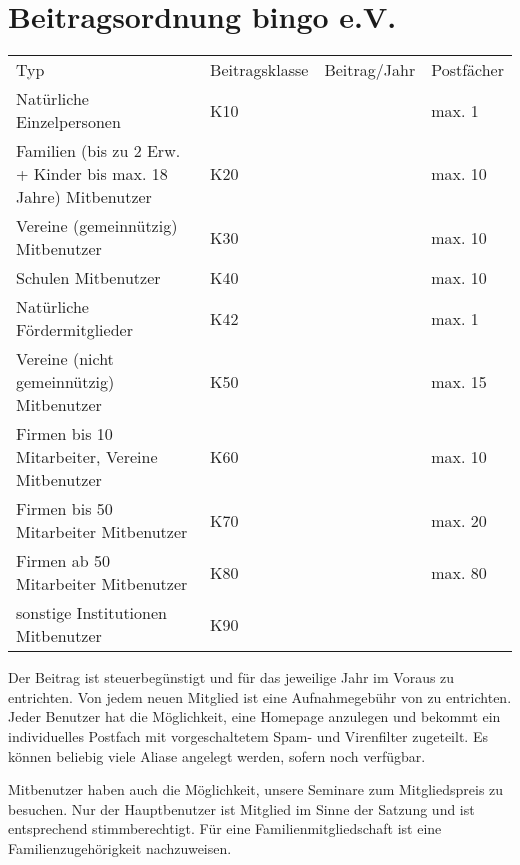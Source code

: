 \section{Beitragsordnung bingo e.V.} \label{sec:beitragsordnung}
\begin{tabu}{X[3]XX[r]X}
	\rowfont{\bfseries}
	Typ                                                             & Beitrags\-klasse& Beitrag/Jahr      & Postfächer \\
	Natürliche Einzelpersonen                                       & K10             &         & max. 1 \\
	Familien (bis zu 2 Erw. + Kinder bis max. 18 Jahre) Mitbenutzer & K20             &         & max. 10\\
	Vereine (gemeinnützig) Mitbenutzer                              & K30             &         & max. 10\\
	Schulen Mitbenutzer                                             & K40             &         & max. 10\\
	Natürliche Fördermitglieder																			& K42             &        & max. 1 \\
	Vereine (nicht gemeinnützig) Mitbenutzer                        & K50             &        & max. 15\\
	Firmen bis 10 Mitarbeiter, Vereine Mitbenutzer                  & K60             &        & max. 10\\
	Firmen bis 50 Mitarbeiter Mitbenutzer                           & K70             &        & max. 20\\
	Firmen ab 50 Mitarbeiter Mitbenutzer                            & K80             &        & max. 80\\
	sonstige Institutionen Mitbenutzer    					                & K90             &										&\\
\end{tabu}

Der Beitrag ist steuerbegünstigt und für das jeweilige Jahr im Voraus zu entrichten.
Von jedem neuen Mitglied ist eine Aufnahmegebühr von  zu entrichten.
Jeder Benutzer hat die Möglichkeit, eine Homepage anzulegen
und bekommt ein individuelles Postfach mit vorgeschaltetem Spam- und Virenfilter zugeteilt.
Es können beliebig viele Aliase angelegt werden, sofern noch verfügbar.

Mitbenutzer haben auch die Möglichkeit, unsere Seminare zum Mitgliedspreis zu besuchen.
Nur der Hauptbenutzer ist Mitglied im Sinne der Satzung und ist entsprechend stimmberechtigt.
Für eine Familienmitgliedschaft ist eine Familienzugehörigkeit nachzuweisen.

